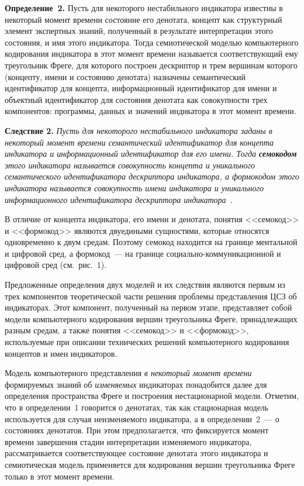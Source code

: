 \begin{multicols}{2}
   \noindent
   \textbf{Определение~2.} {Пусть для некоторого нестабильного индикатора 
известны в некоторый момент времени состояние его денотата, концепт как структурный 
элемент экспертных знаний, полученный в результате интерпретации этого состояния, и имя 
этого индикатора. Тогда семиотической моделью компьютерного кодирования индикатора в 
этот момент времени называется соответствующий ему треугольник Фреге, для которого 
построен дескриптор и трем вершинам которого (концепту, имени и состоянию денотата) 
назначены семантический идентификатор для концепта, информационный идентификатор 
для имени и объектный идентификатор для состояния денотата как совокупности трех 
компонентов: программы, данных и значений индикатора в этот момент времени.}
   
   \smallskip
   
   \noindent
   \textbf{Следствие 2.} 
\textit{Пусть для некоторого нестабильного индикатора заданы в 
некоторый момент времени семантический идентификатор для концепта индикатора и 
информационный идентификатор для его имени. Тогда} 
{\bfseries\textit{семокодом}} 
\textit{этого индикатора называется совокупность концепта и уникального семантического 
идентификатора дескриптора индикатора, а формокодом этого индикатора называется 
совокупность имени индикатора и уникального информационного идентификатора 
дескриптора индикатора}~\cite{15-zat}.
   
   В отличие от концепта индикатора, его имени и денотата, понятия <<семокод>> и 
<<формокод>> являются двуедиными сущностями, которые относятся одновременно к двум 
средам. Поэтому семокод находится на границе ментальной и циф\-ро\-вой 
сред, а формокод~--- на границе социально-коммуникационной и цифровой сред (см.\ 
рис.~1).
   
   Предложенные определения двух моделей и их следствия являются первым из трех 
компонентов теоретической части решения проблемы пред\-став\-ле\-ния ЦСЗ об индикаторах. 
Этот компонент, получен\-ный на первом этапе, представляет собой модели компьютерного 
кодирования вершин треугольника Фреге, принадлежащих разным средам, а также понятия 
<<семокод>> и <<формокод>>, используемые при описании технических решений 
компьютерного кодирования концептов и имен индикаторов.
   
   Модель компьютерного представления \textit{в некоторый момент времени} 
формируемых знаний об\linebreak
\textit{изменяемых} индикаторах понадобится далее для 
определения пространства Фреге и построения нестационарной модели. Отметим, что в 
определении~1 говорится о денотатах, так как стационарная модель 
используется для случая не\-из\-ме\-ня\-емо\-го индикатора, а в определении~2~--- о 
состояниях денотатов. При этом предполагается, что фиксируется момент времени 
завершения стадии интерпретации изменяемого индикатора, рассматривается 
соответствующее состояние денотата этого индикатора и семиотическая модель применяется 
для кодирования вершин треугольника Фреге только в этот момент времени.
   

\end{multicols}
